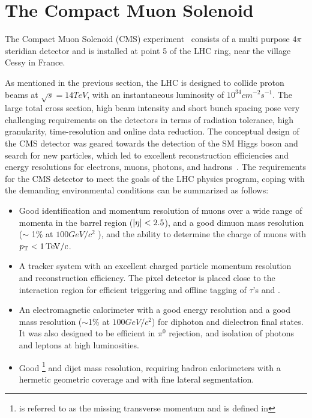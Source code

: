 \section{The Compact Muon Solenoid}
The Compact Muon Solenoid (CMS) experiment~\cite{Chatrchyan:2008aa} consists of a multi purpose $4\pi$ steridian detector and is installed at 
point 5 of the LHC ring, near the village Cessy in France. 

As mentioned in the previous section, the LHC is designed to collide proton beams at $\sqrt{s}=14\unit{TeV}$, with an instantaneous luminosity 
of $10^{34}\unit{cm^{-2}s^{-1}}$. The large \pp total cross section, high beam intensity and short bunch spacing pose very challenging
requirements on the detectors in terms of radiation tolerance, high granularity, time-resolution and online data reduction. The conceptual 
design of the CMS detector was geared towards the detection of the SM Higgs boson and search for new particles, which led to excellent 
reconstruction efficiencies and energy resolutions for electrons, muons, photons, and hadrons~\cite{cmsTDR}. The requirements for the CMS detector
to meet the goals of the LHC physics program, coping with the demanding environmental conditions can be summarized as follows:
\begin{itemize}
\item Good identification and momentum resolution of muons over a wide range of momenta in the barrel region ($\lvert \eta \rvert<2.5$), and a good dimuon mass 
resolution ($\sim$ 1\% at $100\unit{GeV/c^{2}}$ ), and the ability to determine the charge of muons with $p_{\mathrm T} < 1\mathrm{\,TeV/c}$.
\item A tracker system with an excellent charged particle momentum resolution and reconstruction efficiency. The pixel detector is placed close to the 
interaction region for efficient triggering and offline tagging of $\tau$'s and \bjets.
\item An electromagnetic calorimeter with a good energy resolution and a good mass resolution ($\sim$1\% at $100\unit{GeV/c^{2}}$)
for diphoton and dielectron final states. It was also designed to be efficient in $\pi^{0}$ rejection, and isolation of photons and leptons at high 
luminosities.
\item Good \met\footnote{\met is referred to as the missing transverse momentum and is defined in \sectn{~\ref{sec:coord}}} and dijet mass resolution, requiring hadron calorimeters with a hermetic geometric coverage and with fine lateral segmentation.
\end{itemize}

